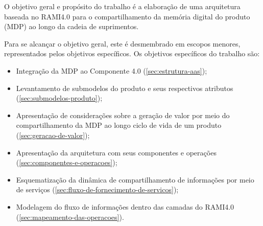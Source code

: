O objetivo geral e propósito do trabalho é a elaboração de uma arquitetura baseada no RAMI4.0 para o compartilhamento da memória digital do produto (MDP) ao longo da cadeia de suprimentos.

Para se alcançar o objetivo geral, este é desmembrado em escopos menores, representados pelos objetivos específicos. Os objetivos específicos do trabalho são:

\begin{itemize}
  \item Integração da MDP ao Componente 4.0 (\autoref{sec:estrutura-aas});
  \item Levantamento de submodelos do produto e seus respectivos atributos (\autoref{sec:submodelos-produto});
  \item Apresentação de considerações sobre a geração de valor por meio do compartilhamento da MDP ao longo ciclo de vida de um produto (\autoref{sec:geracao-de-valor});
  \item Apresentação da arquitetura com seus componentes e operações (\autoref{sec:componentes-e-operacoes});
  \item Esquematização da dinâmica de compartilhamento de informações por meio de serviços (\autoref{sec:fluxo-de-fornecimento-de-servicos});
  \item Modelagem do fluxo de informações dentro das camadas do RAMI4.0 (\autoref{sec:mapeamento-das-operacoes}).
\end{itemize}






